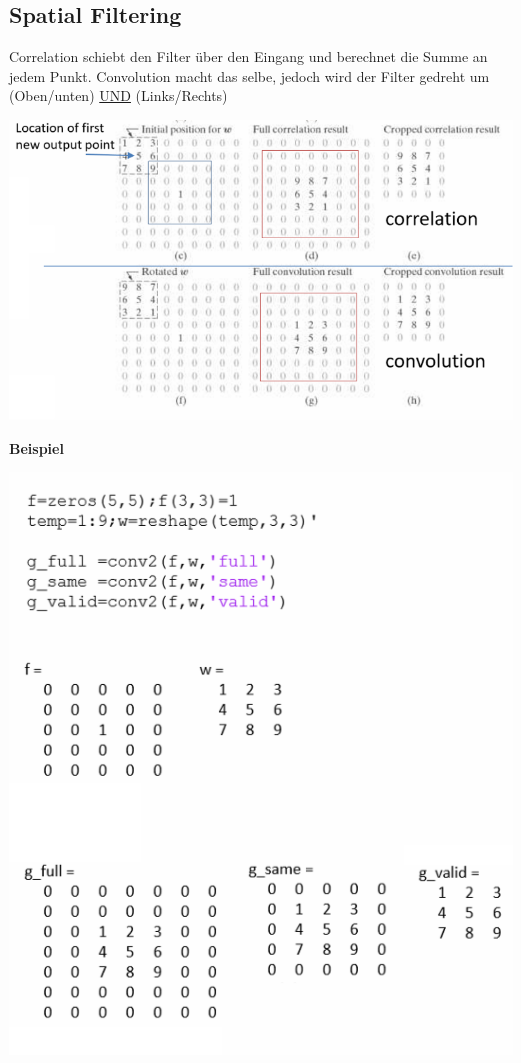 \subsection{Spatial Filtering}
Correlation schiebt den Filter über den Eingang und berechnet die Summe an jedem Punkt. Convolution macht das selbe, jedoch wird der Filter gedreht um (Oben/unten) \underline{UND} (Links/Rechts)
\begin{center}
	\includegraphics[width=\columnwidth]{Images/conv_cor}
\end{center}

\textbf{Beispiel}
\begin{center}
	\includegraphics[width=\columnwidth]{Images/conv_cor_m}
\end{center}

